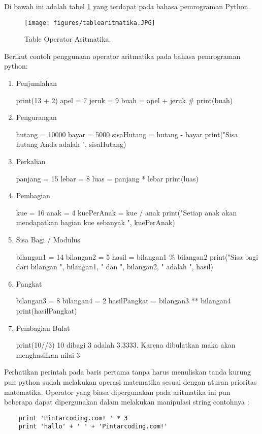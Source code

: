 \begin{eqation}
Di bawah ini adalah tabel \ref{tablearitmatika} yang terdapat pada bahasa pemrograman Python.
\begin{figure}[ht]
	\centerline{\texttt{[image: figures/tablearitmatika.JPG]}}
	\caption{Table Operator Aritmatika.}
	\label{tablearitmatika}
\end{figure}

Berikut contoh penggunaan operator aritmatika pada bahasa pemrograman python:
\begin{enumerate}

\item Penjumlahan
	
	print(13 + 2)
	apel = 7
	jeruk = 9
	buah = apel + jeruk #
	print(buah)

\item Pengurangan

	hutang = 10000
	bayar = 5000
	sisaHutang = hutang - bayar
	print("Sisa hutang Anda adalah ", sisaHutang)
	
\item Perkalian

	panjang = 15
	lebar = 8
	luas = panjang * lebar
	print(luas)
	
\item Pembagian

	kue = 16
	anak = 4
	kuePerAnak = kue / anak
	print("Setiap anak akan mendapatkan bagian kue sebanyak ", kuePerAnak)
	
\item Sisa Bagi / Modulus

	bilangan1 = 14
	bilangan2 = 5
	hasil = bilangan1 \% bilangan2
	print("Sisa bagi dari bilangan ", bilangan1, " dan ", bilangan2, " adalah ", hasil)
	
\item Pangkat

	bilangan3 = 8
	bilangan4 = 2
	hasilPangkat = bilangan3 ** bilangan4
	print(hasilPangkat)
	
\item Pembagian Bulat

	print(10//3) 
	10 dibagi 3 adalah 3.3333. Karena dibulatkan maka akan menghasilkan nilai 3
	
\end{enumerate}

Perhatikan perintah pada baris pertama tanpa harus menuliskan tanda kurung pun python sudah melakukan operasi matematika sesuai dengan aturan prioritas matematika. Operator yang biasa dipergunakan pada aritmatika ini pun beberapa dapat dipergunakan dalam melakukan manipulasi string contohnya :
\begin{verbatim}
	print 'Pintarcoding.com! ' * 3
	print 'hallo' + ' ' + 'Pintarcoding.com!'
\end{verbatim}


\end{eqation}
